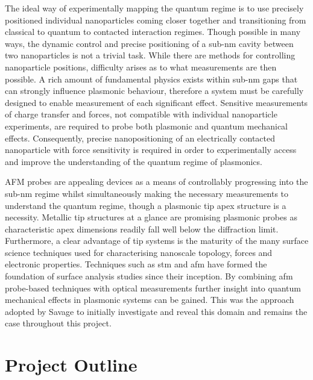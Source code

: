 \documentclass[12pt, a4paper, twoside]{book}
\begin{document}
The ideal way of experimentally mapping the quantum regime is to use precisely positioned individual nanoparticles coming closer together and transitioning from classical to quantum to contacted interaction regimes. Though possible in many ways, the dynamic control and precise positioning of a sub-nm cavity between two nanoparticles is not a trivial task. While there are methods for controlling nanoparticle positions, difficulty arises as to what measurements are then possible. A rich amount of fundamental physics exists within sub-nm gaps that can strongly influence plasmonic behaviour, therefore a system must be carefully designed to enable measurement of each significant effect. Sensitive measurements of charge transfer and forces, not compatible with individual nanoparticle experiments, are required to probe both plasmonic and quantum mechanical effects. Consequently, precise nanopositioning of an electrically contacted nanoparticle with force sensitivity is required in order to experimentally access and improve the understanding of the quantum regime of plasmonics.

AFM probes are appealing devices as a means of controllably progressing into the sub-nm regime whilst simultaneously making the necessary measurements to understand the quantum regime, though a plasmonic tip apex structure is a necessity. Metallic tip structures at a glance are promising plasmonic probes as  characteristic apex dimensions readily fall well below the diffraction limit. Furthermore, a clear advantage of tip systems is the maturity of the many surface science techniques used for characterising nanoscale topology, forces and electronic properties. Techniques such as \gls{stm} \cite{binnig1982} and \gls{afm} \cite{binnig1986} have formed the foundation of surface analysis studies since their inception. By combining \gls{afm} probe-based techniques with optical measurements further insight into quantum mechanical effects in plasmonic systems can be gained. This was the approach adopted by Savage  to initially investigate and reveal this domain \cite{savage2012} and remains the case throughout this project.

\section{Project Outline}
\end{document}

